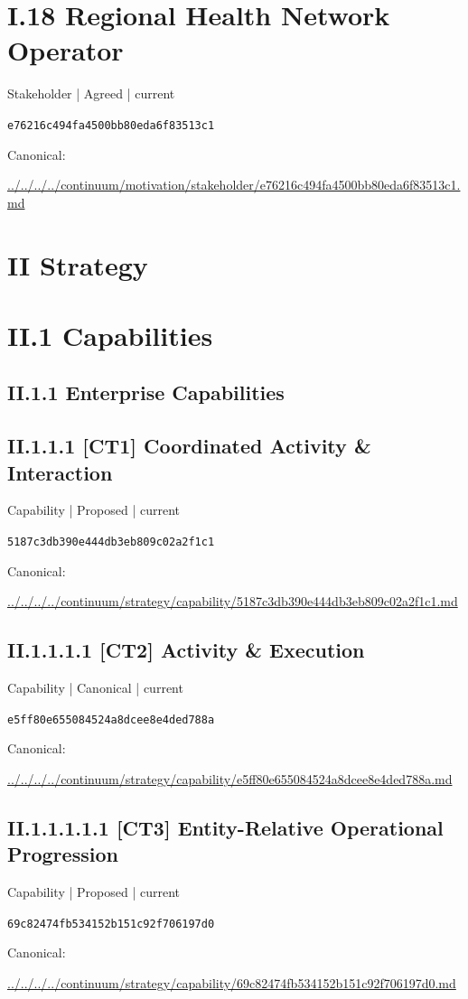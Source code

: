 \documentclass[10pt,a4paper]{article}
\begin{document}
\section*{I.18 Regional Health Network Operator}
{\small Stakeholder | Agreed | current}\par
\texttt{e76216c494fa4500bb80eda6f83513c1}\par
Canonical: \par
{\footnotesize\url{../../../../continuum/motivation/stakeholder/e76216c494fa4500bb80eda6f83513c1.md}}\par
\section*{II Strategy}
\section*{II.1 Capabilities}
\subsection*{II.1.1 Enterprise Capabilities}
\subsection*{II.1.1.1 [CT1] Coordinated Activity \& Interaction}
{\small Capability | Proposed | current}\par
\texttt{5187c3db390e444db3eb809c02a2f1c1}\par
Canonical: \par
{\footnotesize\url{../../../../continuum/strategy/capability/5187c3db390e444db3eb809c02a2f1c1.md}}\par
\subsection*{II.1.1.1.1 [CT2] Activity \& Execution}
{\small Capability | Canonical | current}\par
\texttt{e5ff80e655084524a8dcee8e4ded788a}\par
Canonical: \par
{\footnotesize\url{../../../../continuum/strategy/capability/e5ff80e655084524a8dcee8e4ded788a.md}}\par
\subsection*{II.1.1.1.1.1 [CT3] Entity-Relative Operational Progression}
{\small Capability | Proposed | current}\par
\texttt{69c82474fb534152b151c92f706197d0}\par
Canonical: \par
{\footnotesize\url{../../../../continuum/strategy/capability/69c82474fb534152b151c92f706197d0.md}}\par
\end{document}
